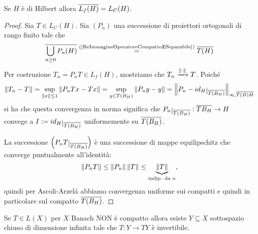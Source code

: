 \begin{proposition}[]\label{PrInHilbertOperatoriRangoFinitoDenseInOperatoriCompatti}
Se $H$ \`e di Hilbert allora $\ol{L_f(H)}=L_C(H)$.
\end{proposition}
\begin{proof}
Sia $T\in L_C(H)$. Sia $(P_n)$ una successione di proiettori ortogonali di rango finito tale che
\[\ol{\bigcup_{n\geq 0}P_n(H)}\pasgnl={(\ref{ReImmagineOperatoreCompattoESeparabile})}\ol{T(H)}\]
Per costruzione $T_n=P_nT\in L_f(H)$, mostriamo che $T_n\xrightarrow{\normd}T$. Poich\'e
\[\norm{T_n-T}=\sup_{\norm x\leq 1}\norm{P_nT x-Tx}=\sup_{y\in T(B_H)}\norm{P_n y-y}=\norm{P_n-id_H\res{\ol{T(B_H)}}}_{\infty,\ol{T(B)H}}\]
si ha che questa convergenza in norma significa che $P_n\res{\ol{T(B_H)}}:\ol{TB_H}\to H$ convege a $I:=id_H\res{\ol{T(B_H)}}$ uniformemente su $\ol{T(B_H)}$.

La successione $\pa{P_n T\res{\ol{T(B_H)}}}$ \`e una successione di mappe equilipschitz che converge puntualmente all'identit\`a:
\[\norm{P_nT}\leq \norm{P_n}\norm T\leq \under{\text{indip. da }n}{\norm T},\]
quindi per Ascoli-Arzel\'a abbiamo convergenza uniforme sui compatti e quindi in particolare sul compatto $\ol{T(B_H)}$.
\end{proof}

\begin{lemma}[]\label{LmOperatoreNonChiusoSiRestringeAInvertibileSuSottospazioDiDimensioneInfinita}
Se $T\in L(X)$ per $X$ Banach NON \`e compatto allora esiste $Y\subseteq X$ sottospazio chiuso di dimensione infinita tale che $T:Y\to TY$ \`e invertibile.
\end{lemma}

